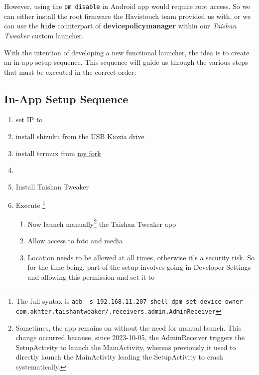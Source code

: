 However, using the \texttt{\color{BrickRed}pm disable} in Android app would require root access. So we can either install the root firmware the Havistouch team provided us with, or we can use the \texttt{\color{BrickRed}hide} counterpart of \textbf{\color{BrickRed}devicepolicymanager} within our \emph{Taishan Tweaker} custom launcher.

With the intention of developing a new functional launcher, the idea is to create an in-app setup sequence. This sequence will guide us through the various steps that must be executed in the correct order:

\subsection{In-App Setup Sequence}

\begin{enumerate}
    \item set IP to \ipnum{\taishanIP}
    \item install \gls{shizuku} from the USB Kioxia drive
    \item install \gls{termux} from \href{https://github.com/danieledellacioppa/termux-app}{my fork}
    \item {}
    \item \faPlayCircle Install Taishan Tweaker
    \item Execute \footnote{\label{dpm-enable-command} The full syntax is \texttt{\color{BrickRed}adb -s 192.168.11.207 shell dpm set-device-owner com.akhter.taishantweaker/.receivers.admin.AdminReceiver}}
        \begin{enumerate}
            \item{Now launch manually\footnote{\label{manually}Sometimes, the app remains on without the need for manual launch. This change occurred because, since 2023-10-05, the AdminReceiver triggers the SetupActivity to launch the MainActivity, whereas previously it used to directly launch the MainActivity leading the SetupActivity to crash systematically.} the Taishan Tweaker app}
            \item{Allow access to foto and media}
            \item{ Location needs to be allowed at all times, otherwise it's a security risk. So for the time being, part of the setup involves going in Developer Settings and allowing this permission and set it to {\color{Bluetto} }}

\end{enumerate}
\end{enumerate}
